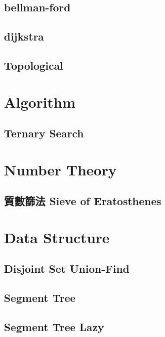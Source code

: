     \subsection{bellman-ford}
        
    \subsection{dijkstra}
        
    \subsection{Topological}
        
\section{Algorithm}
    \subsection{Ternary Search}
        
\section{Number Theory}
    \subsection{質數篩法 Sieve of Eratosthenes}
        

\section{Data Structure}
    \subsection{Disjoint Set Union-Find}
        
    \subsection{Segment Tree}
        
    \subsection{Segment Tree Lazy}
        
